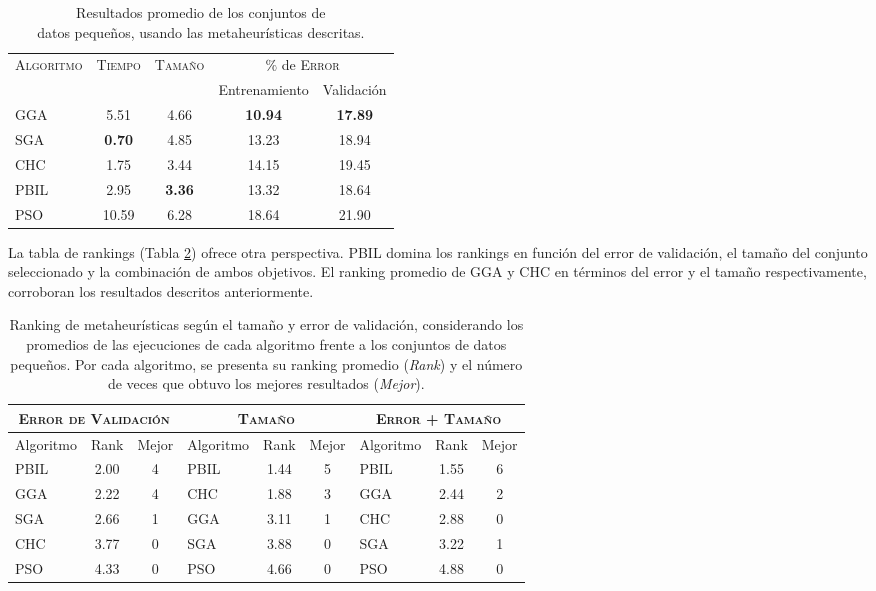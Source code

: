 \begin{table}[h!]
\centering
\begin{tabular}{l c c c c}
\hline
\multirow{2}{*}{\textsc{Algoritmo}}
	& \multirow{2}{*}{\textsc{Tiempo}}
	& \multirow{2}{*}{\textsc{Tamaño}}
	& \multicolumn{2}{c}{$\%$ de \textsc{Error}} \\\cline{4-5}
 & & & \scriptsize{Entrenamiento} & \scriptsize{Validación} \\
\hline
\hline
GGA  &  5.51 & 4.66 & \textbf{10.94} & \textbf{17.89} \\
SGA  & \textbf{0.70} & 4.85 & 13.23 & 18.94 \\
CHC  &  1.75 & 3.44 & 14.15 & 19.45 \\
PBIL &  2.95 & \textbf{3.36} & 13.32 & 18.64 \\
PSO  & 10.59 & 6.28 & 18.64 & 21.90 \\
\hline
\end{tabular}
\caption[Resultados de metaheurísticas usando conjuntos de datos pequeños]{Resultados promedio de los conjuntos de\\datos pequeños, usando las metaheurísticas descritas.}
\label{res-small}
\end{table}

La tabla de rankings (Tabla \ref{res-small-rank}) ofrece otra perspectiva. PBIL domina los rankings en función del error de validación, el tamaño del conjunto seleccionado y la combinación de ambos objetivos. El ranking promedio de GGA y CHC en términos del error y el tamaño respectivamente, corroboran los resultados descritos anteriormente.

\begin{table}[h!]
\centering
\begin{tabular}{l c c|l c c|l c c}
\hline
\multicolumn{3}{c|}{\textsc{Error de Validación}}
	& \multicolumn{3}{c|}{\textsc{Tamaño}}
	& \multicolumn{3}{c}{\textsc{Error + Tamaño}} \\
\hline
Algoritmo & Rank & Mejor & Algoritmo & Rank & Mejor & Algoritmo & Rank & Mejor \\
\hline
\hline
PBIL & 2.00 & 4 & PBIL & 1.44 & 5 & PBIL & 1.55 & 6 \\
GGA  & 2.22 & 4 & CHC  & 1.88 & 3 & GGA  & 2.44 & 2 \\
SGA  & 2.66 & 1 & GGA  & 3.11 & 1 & CHC  & 2.88 & 0 \\
CHC  & 3.77 & 0 & SGA  & 3.88 & 0 & SGA  & 3.22 & 1 \\
PSO  & 4.33 & 0 & PSO  & 4.66 & 0 & PSO  & 4.88 & 0 \\
\hline
\end{tabular}
\caption[Ranking de metaheurísticas según el tamaño y error de validación en conjuntos de datos pequeños]{Ranking de metaheurísticas según el tamaño y error de validación, considerando los promedios de las ejecuciones de cada algoritmo frente a los conjuntos de datos pequeños. Por cada algoritmo, se presenta su ranking promedio (\emph{Rank}) y el número de veces que obtuvo los mejores resultados (\emph{Mejor}).}
\label{res-small-rank}
\end{table}

